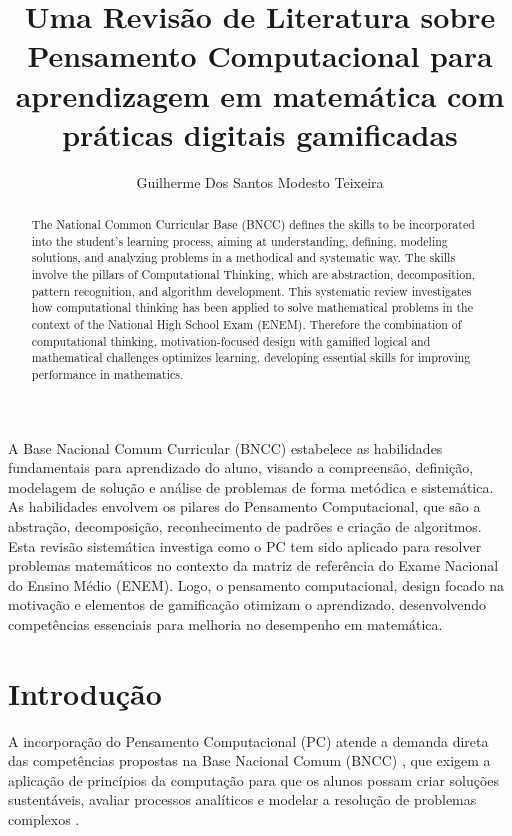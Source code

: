 \documentclass[12pt]{article}
\title{Uma Revisão de Literatura sobre Pensamento Computacional para aprendizagem em matemática com práticas digitais gamificadas }
\author{Guilherme Dos Santos Modesto Teixeira}
\begin{document}
\maketitle

\begin{resumo}
A Base Nacional Comum Curricular (BNCC) estabelece as habilidades fundamentais para aprendizado do aluno, visando a compreensão, definição, modelagem de solução e análise de problemas de forma metódica e sistemática. As habilidades envolvem os pilares do Pensamento Computacional, que são a abstração, decomposição, reconhecimento de padrões e criação de algoritmos. Esta revisão sistemática investiga como o PC tem sido aplicado para resolver problemas matemáticos no contexto da matriz de referência do Exame Nacional do Ensino Médio (ENEM). Logo, o pensamento computacional, design focado na motivação e elementos de gamificação otimizam o aprendizado, desenvolvendo competências essenciais para melhoria no desempenho em matemática.
\end{resumo}

\begin{abstract}
The National Common Curricular Base (BNCC) defines the skills to be incorporated into the student's learning process, aiming at understanding, defining, modeling solutions, and analyzing problems in a methodical and systematic way. The skills involve the pillars of Computational Thinking, which are abstraction, decomposition, pattern recognition, and algorithm development. This systematic review investigates how computational thinking has been applied to solve mathematical problems in the context of the National High School Exam (ENEM). Therefore the combination of computational thinking, motivation-focused design with gamified logical and mathematical challenges optimizes learning, developing essential skills for improving performance in mathematics.
\end{abstract}

\section{Introdução}
A incorporação do Pensamento Computacional (PC) atende a demanda direta das competências propostas na Base Nacional Comum  (BNCC) \cite{brasil2017}, que exigem a aplicação de princípios da computação para que os alunos possam criar soluções sustentáveis, avaliar processos analíticos e modelar a resolução de problemas complexos \cite{bessa2020}.
\end{document}
